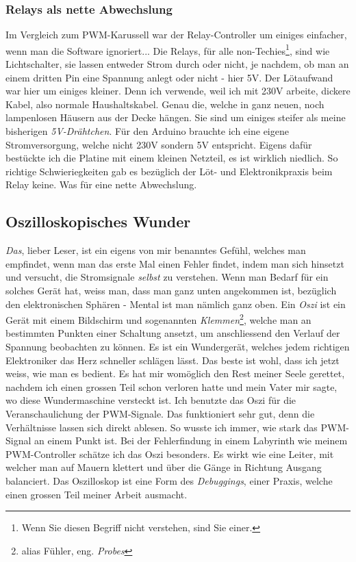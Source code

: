 \documentclass[12pt,titlepage,a4paper]{article}
\begin{document}
\subsubsection{Relays als nette Abwechslung}
Im Vergleich zum PWM-Karussell war der Relay-Controller um einiges einfacher, wenn man die Software ignoriert... Die Relays, für alle non-Techies\footnote{Wenn Sie diesen Begriff nicht verstehen, sind Sie einer.}, sind wie Lichtschalter, sie lassen entweder Strom durch oder nicht, je nachdem, ob man an einem dritten Pin eine Spannung anlegt oder nicht - hier 5V. Der Lötaufwand war hier um einiges kleiner. Denn ich verwende, weil ich mit 230V arbeite, dickere Kabel, also normale Haushaltskabel. Genau die, welche in ganz neuen, noch lampenlosen Häusern aus der Decke hängen. Sie sind um einiges steifer als meine bisherigen \textit{5V-Drähtchen}. Für den Arduino brauchte ich eine eigene Stromversorgung, welche nicht 230V sondern 5V entspricht. Eigens dafür bestückte ich die Platine mit einem kleinen Netzteil, es ist wirklich niedlich. So richtige Schwieriegkeiten gab es bezüglich der Löt- und Elektronikpraxis beim Relay keine. Was für eine nette Abwechslung.

\subsection{Oszilloskopisches Wunder}
\textit{Das}, lieber Leser, ist ein eigens von mir benanntes Gefühl, welches man empfindet, wenn man das erste Mal einen Fehler findet, indem man sich hinsetzt und versucht, die Stromsignale \textit{selbst} zu verstehen. Wenn man Bedarf für ein solches Gerät hat, weiss man, dass man ganz unten angekommen ist, bezüglich den elektronischen Sphären - Mental ist man nämlich ganz oben. Ein \textit{Oszi} ist ein Gerät mit einem Bildschirm und sogenannten \textit{Klemmen}\footnote{alias Fühler, eng. \textit{Probes}}, welche man an bestimmten Punkten einer Schaltung ansetzt, um anschliessend den Verlauf der Spannung beobachten zu können. Es ist ein Wundergerät, welches jedem richtigen Elektroniker das Herz schneller schlägen lässt. Das beste ist wohl, dass ich jetzt weiss, wie man es bedient. Es hat mir womöglich den Rest meiner Seele gerettet, nachdem ich einen grossen Teil schon verloren hatte und mein Vater mir sagte, wo diese Wundermaschine versteckt ist. Ich benutzte das Oszi für die Veranschaulichung der PWM-Signale. Das funktioniert sehr gut, denn die Verhältnisse lassen sich direkt ablesen. So wusste ich immer, wie stark das PWM-Signal an einem Punkt ist. Bei der Fehlerfindung in einem Labyrinth wie meinem PWM-Controller schätze ich das Oszi besonders. Es wirkt wie eine Leiter, mit welcher man auf Mauern klettert und über die Gänge in Richtung Ausgang balanciert. Das Oszilloskop ist eine Form des \textit{Debuggings}, einer Praxis, welche einen grossen Teil meiner Arbeit ausmacht.
\end{document}
